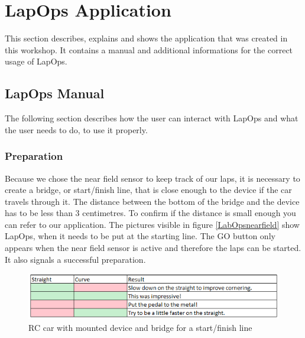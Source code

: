 \chapter{LapOps Application}\label{manual}
This section describes, explains and shows the application that was created in this workshop. It contains a manual and additional informations for the correct usage of LapOps.

\section{LapOps Manual}
The following section describes how the user can interact with LapOps and what the user needs to do, to use it properly.

\subsection{Preparation}\label{prep}
Because we chose the near field sensor to keep track of our laps, it is necessary to create a bridge, or start/finish line, that is close enough to the device if the car travels through it. The distance between the bottom of the bridge and the device has to be less than 3 centimetres. To confirm if the distance is small enough you can refer to our application. The pictures visible in figure \ref{LabOpsnearfield} show LapOps, when it needs to be put at the starting line. The GO button only appears when the near field sensor is active and therefore the laps can be started. It also signals a successful preparation.

\begin{figure}[H]
	\centering
	\includegraphics[scale= 0.9]{Pictures/StraightResultMapping.png}
	\caption{RC car with mounted device and bridge for a start/finish line}
	\label{startFinishLineWithRC}
\end{figure}

